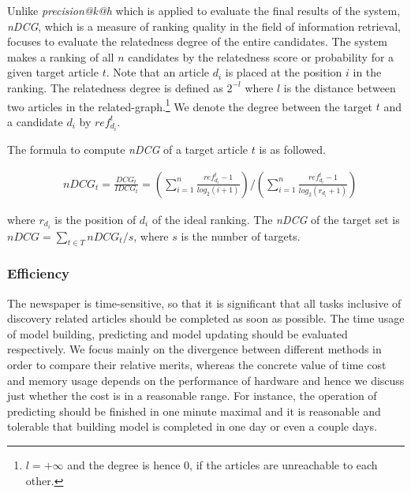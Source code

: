 Unlike \textit{precision@k@h} which is applied to evaluate the final results of the system, \textit{nDCG}, which is a measure of ranking quality in the field of information retrieval, focuses to evaluate the relatedness degree of the entire candidates. The system makes a ranking of all $n$ candidates by the relatedness score or probability for a given target article $t$. Note that an article $d_i$ is placed at the position $i$ in the ranking. The relatedness degree is defined as $2^{-l}$ where $l$ is the distance between two articles in the related-graph.\footnote{$l=+\infty$ and the degree is hence $0$, if the articles are unreachable to each other.} We denote the degree between the target $t$ and a candidate $d_i$ by $ref_{d_i}^t$.

The formula to compute \textit{nDCG} of a target article $t$ is as followed. 

\begin{align}
   & nDCG_t = \frac{DCG_t}{IDCG_t} = (\sum_{i=1}^n\frac{ref_{d_i}^t-1}{log_2(i+1)})/(\sum_{i=1}^n\frac{ref_{d_i}^t-1}{log_2(r_{d_i}+1)})
\end{align}

where $r_{d_i}$ is the position of $d_i$ of the ideal ranking. The \textit{nDCG} of the target set is $nDCG = \sum_{t \in T}nDCG_t/s$, where $s$ is the number of targets.

\subsubsection{Efficiency}

The newspaper is time-sensitive, so that it is significant that all tasks inclusive of discovery related articles should be completed as soon as possible. The time usage of model building, predicting and model updating should be evaluated respectively. We focus mainly on the divergence between different methods in order to compare their relative merits, whereas the concrete value of time cost and memory usage depends on the performance of hardware and hence we discuss just whether the cost is in a reasonable range. For instance, the operation of predicting should be finished in one minute maximal and it is reasonable and tolerable that building model is completed in one day or even a couple days. 
